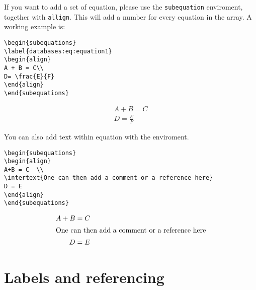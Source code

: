 If you want to add a set of equation, please use the {\tt subequation} enviroment, together with {\tt allign}.
This will add a number for every equation in the array. A working example is:
\begin{verbatim}
\begin{subequations}
\label{databases:eq:equation1}
\begin{align}
A + B = C\\
D= \frac{E}{F}  
\end{align}
\end{subequations}
\end{verbatim}
\begin{subequations}
\label{databases:eq:equation1}
\begin{align}
A + B = C\\
D= \frac{E}{F}  
\end{align}
\end{subequations}

%
You can also add text within equation with the {\tt \string\intertex} enviroment.
\begin{verbatim}
\begin{subequations}
\begin{align}
A+B = C  \\
\intertext{One can then add a comment or a reference here}
D = E 
\end{align}
\end{subequations}
\end{verbatim}
\begin{subequations}
\begin{align}
A+B = C  \\
\intertext{One can then add a comment or a reference here}
D = E 
\end{align}
\end{subequations}



\section{Labels and referencing}


